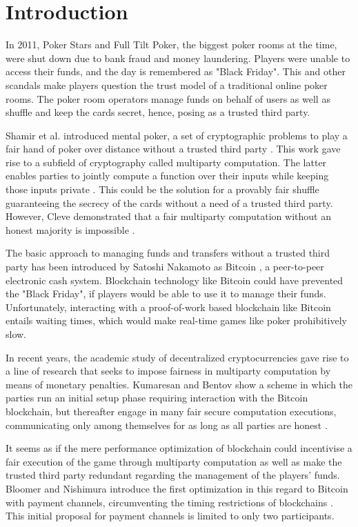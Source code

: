 \section{Introduction}

In 2011, Poker Stars and Full Tilt Poker, the biggest poker rooms at the time, were shut down due to bank fraud and money laundering. Players were unable to access their funds, and the day is remembered as "Black Friday"\cite{treasury11}. This and other scandals make players question the trust model of a traditional online poker rooms. The poker room operators manage funds on behalf of users as well as shuffle and keep the cards secret, hence, posing as a trusted third party.

Shamir et al. \cite{shamir81} introduced mental poker, a set of cryptographic problems to play a fair hand of poker over distance without a trusted third party \cite{wikiMental}. This work gave rise to a subfield of cryptography called multiparty computation. The latter enables parties to jointly compute a function over their inputs while keeping those inputs private \cite{wikiMPC}. This could be the solution for a provably fair shuffle guaranteeing the secrecy of the cards without a need of a trusted third party. However, Cleve demonstrated that a fair multiparty computation without an honest majority is impossible \cite{cleve86}.

The basic approach to managing funds and transfers without a trusted third party has been introduced by Satoshi Nakamoto as Bitcoin \cite{nakamoto08}, a peer-to-peer electronic cash system. Blockchain technology like Bitcoin could have prevented the "Black Friday", if players would be able to use it to manage their funds. Unfortunately, interacting with a proof-of-work based blockchain like Bitcoin entails waiting times, which would make real-time games like poker prohibitively slow.

In recent years, the academic study of decentralized cryptocurrencies gave rise to a line of research that seeks to impose fairness in multiparty computation by means of monetary penalties. Kumaresan and Bentov show a scheme in which the parties run an initial setup phase requiring interaction with the Bitcoin blockchain, but thereafter engage in many fair secure computation executions, communicating only among themselves for as long as all parties are honest \cite{bentov14}.

It seems as if the mere performance optimization of blockchain could incentivise a fair execution of the game through multiparty computation as well as make the trusted third party redundant regarding the management of the players' funds. Bloomer and Nishimura introduce the first optimization in this regard to Bitcoin with payment channels, circumventing the timing restrictions of blockchains \cite{bloomer14}. This initial proposal for payment channels is limited to only two participants.
 
